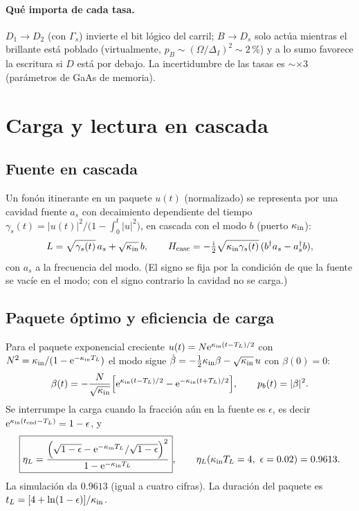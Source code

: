 \documentclass[11pt,a4paper]{article}
\newcommand{\ee}{\mathrm{e}}
\newcommand{\ii}{\mathrm{i}}
\begin{document}
\paragraph{Qué importa de cada tasa.}
$D_1\to D_2$ (con $\Gamma_s$) invierte el bit lógico del carril; $B\to D_s$ solo actúa mientras el brillante está poblado (virtualmente, $p_B\sim(\Omega/\Delta_I)^2\sim2$\,\%)
y a lo sumo favorece la escritura si $D$ está por debajo. La incertidumbre de las tasas es $\sim\times3$ (parámetros de GaAs de memoria).

\section{Carga y lectura en cascada}\label{sec:cascada}
\subsection{Fuente en cascada}
Un fonón itinerante en un paquete $u(t)$ (normalizado) se representa por una cavidad fuente $a_s$ con decaimiento dependiente del tiempo
$\gamma_s(t)=|u(t)|^2/\big(1-\int_{0}^{t}|u|^2\big)$, en cascada con el modo $b$ (puerto $\kappa_{\rm in}$):
\begin{equation}
L=\sqrt{\gamma_s(t)}\,a_s+\sqrt{\kappa_{\rm in}}\,b,\qquad
H_{\rm casc}=-\tfrac{\ii}{2}\sqrt{\kappa_{\rm in}\gamma_s(t)}\,(b^\dagger a_s-a_s^\dagger b),
\end{equation}
con $a_s$ a la frecuencia del modo. (El signo se fija por la condición de que la fuente se vacíe en el modo; con el signo contrario la cavidad no se carga.)

\subsection{Paquete óptimo y eficiencia de carga}
Para el paquete exponencial creciente $u(t)=N\ee^{\kappa_{\rm in}(t-T_L)/2}$ con $N^2=\kappa_{\rm in}/(1-\ee^{-\kappa_{\rm in}T_L})$ el modo
sigue $\dot\beta=-\tfrac12\kappa_{\rm in}\beta-\sqrt{\kappa_{\rm in}}\,u$ con $\beta(0)=0$:
\begin{equation}
\beta(t)=-\frac{N}{\sqrt{\kappa_{\rm in}}}\Big[\ee^{\kappa_{\rm in}(t-T_L)/2}-\ee^{-\kappa_{\rm in}(t+T_L)/2}\Big],
\qquad p_b(t)=|\beta|^2 .
\end{equation}
Se interrumpe la carga cuando la fracción aún en la fuente es $\epsilon$, es decir $\ee^{\kappa_{\rm in}(t_{\rm end}-T_L)}=1-\epsilon$, y
\begin{equation}
\boxed{\eta_L=\frac{\Big(\sqrt{1-\epsilon}-\ee^{-\kappa_{\rm in}T_L}/\sqrt{1-\epsilon}\Big)^{2}}{1-\ee^{-\kappa_{\rm in}T_L}}},\qquad
\eta_L(\kappa_{\rm in}T_L=4,\ \epsilon=0.02)=0.9613 . \label{eq:etaL}
\end{equation}
La simulación da $0.9613$ (igual a cuatro cifras). La duración del paquete es $t_L=[4+\ln(1-\epsilon)]/\kappa_{\rm in}$.
\end{document}
